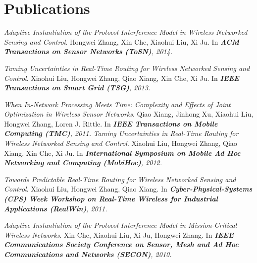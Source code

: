 
\section{Publications}
\begin{thebibliography}{8}
\emph{Adaptive Instantiation of the Protocol Interference Model in Wireless Networked Sensing and Control}. Hongwei Zhang, Xin Che, Xiaohui Liu, Xi Ju. In \emph{\textbf{ACM Transactions on Sensor Networks (ToSN)}, 2014.}

\emph{Taming Uncertainties in Real-Time Routing for Wireless Networked Sensing and Control}. Xiaohui Liu, Hongwei Zhang, Qiao Xiang, Xin Che, Xi Ju. In \emph{\textbf{IEEE Transactions on Smart Grid (TSG)}, 2013.}

\emph{When In-Network Processing Meets Time: Complexity and Effects of Joint Optimization in Wireless Sensor Networks}. Qiao Xiang, Jinhong Xu, Xiaohui Liu, Hongwei Zhang, Loren J. Rittle. In \emph{\textbf{IEEE Transactions on Mobile Computing (TMC)}, 2011.}
\emph{Taming Uncertainties in Real-Time Routing for Wireless Networked Sensing and Control}. Xiaohui Liu, Hongwei Zhang, Qiao Xiang, Xin Che, Xi Ju. In \emph{\textbf{International Symposium on Mobile Ad Hoc Networking and Computing (MobiHoc)}, 2012.}

\emph{Towards Predictable Real-Time Routing for Wireless Networked Sensing and Control}. Xiaohui Liu, Hongwei Zhang, Qiao Xiang. In \emph{\textbf{Cyber-Physical-Systems (CPS) Week Workshop on Real-Time Wireless for Industrial Applications (RealWin)}, 2011.}

\emph{Adaptive Instantiation of the Protocol Interference Model in Mission-Critical Wireless Networks}. Xin Che, Xiaohui Liu, Xi Ju, Hongwei Zhang. In \emph{\textbf{IEEE Communications Society Conference on Sensor, Mesh and Ad Hoc Communications and Networks (SECON)}, 2010.}


\end{thebibliography}
